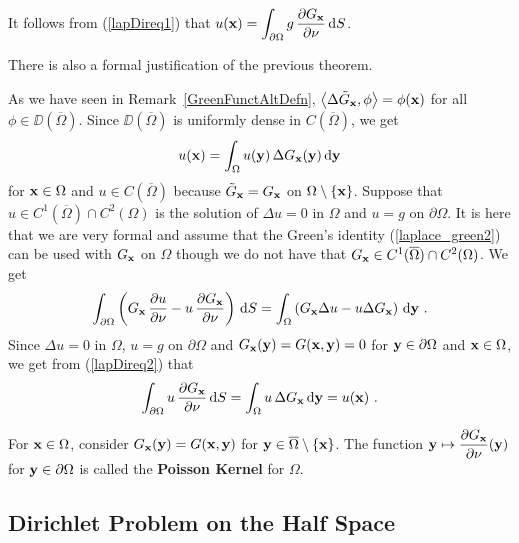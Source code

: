 It follows from (\ref{lapDireq1}) that
$\displaystyle u(\mathbf{x}) = \int_{\partial \Omega}
g\,\frac{\partial{G_{\mathbf{x}}}}{\partial \mathbf{\nu}} \,\mathrm{d}{S}$.

\begin{rmk}
There is also a formal justification of the previous theorem.

As we have seen in Remark~\ref{GreenFunctAltDefn},
$\displaystyle \left\langle{\Delta \tilde{G}_{\mathbf{x}}} , {\phi}\right\rangle = \phi(\mathbf{x})$
for all $\phi \in \DD(\overline{\Omega})$.
Since $\DD(\overline{\Omega})$ is uniformly dense in
$C(\overline{\Omega})$, we get
\begin{equation} \label{lapDireq2}
u(\mathbf{x}) = \int_\Omega u(\mathbf{y})\,\Delta G_{\mathbf{x}}(\mathbf{y})
\,\mathrm{d}{\mathbf{y}}
\end{equation}
for $\mathbf{x} \in \Omega$ and $u \in C(\overline{\Omega})$
because $\tilde{G}_{\mathbf{x}} = G_{\mathbf{x}}$
on $\Omega \setminus \{\mathbf{x}\}$.
Suppose that $u \in C^1(\overline{\Omega}) \cap C^2(\Omega)$ is the
solution of $\Delta u = 0$ in $\Omega$ and $u=g$ on $\partial \Omega$.
It is here that we are very formal and assume that
the Green's identity (\ref{laplace_green2}) can be used with
$G_{\mathbf{x}}$ on $\Omega$ though we do not have that
$G_{\mathbf{x}} \in C^1(\overline{\Omega}) \cap C^2(\Omega)$.
We get
\[
\int_{\partial \Omega} \left( G_{\mathbf{x}}\,\frac{\partial{u}}{\partial \mathbf{\nu}} 
- u\,\frac{\partial{G_{\mathbf{x}}}}{\partial \mathbf{\nu}} \right) \,\mathrm{d}{S}
= \int_\Omega \left( G_{\mathbf{x}} \Delta u -
u \Delta G_{\mathbf{x}} \right)\,\mathrm{d}{\mathbf{y}} \ .
\]
Since $\Delta u = 0$ in $\Omega$, $u = g$ on $\partial \Omega$ and
$G_{\mathbf{x}}(\mathbf{y}) = G(\mathbf{x},\mathbf{y}) = 0$ for
$\mathbf{y} \in \partial \Omega$ and $\mathbf{x} \in \Omega$,
we get from (\ref{lapDireq2}) that
\[
\int_{\partial \Omega} u\, \pdydx{G_{\VEC{x}}}{\VEC{\nu}} \dx{S}
= \int_\Omega u\, \Delta G_{\VEC{x}} \dx{\VEC{y}} = u(\VEC{x})  \ .
\]
\end{rmk}

\begin{defn}
For $\mathbf{x} \in \Omega$, consider
$\displaystyle G_{\mathbf{x}}(\mathbf{y}) = G(\mathbf{x},\mathbf{y})$ for
$\mathbf{y} \in \overline{\Omega} \setminus \{\mathbf{x}\}$.  The function
$\displaystyle \mathbf{y} \mapsto \frac{\partial{G_{\mathbf{x}}}}{\partial \mathbf{\nu}}(\mathbf{y})$
for $\mathbf{y}\in \partial \Omega$ is called the
{\bfseries Poisson Kernel} for $\Omega$.
\end{defn}

\subsection{Dirichlet Problem on the Half Space}

